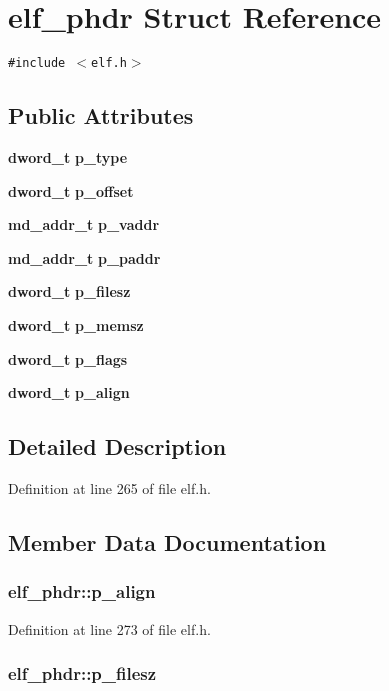 \section{elf\_\-phdr Struct Reference}
\label{structelf__phdr}
{\tt \#include $<$elf.h$>$}

\subsection*{Public Attributes}
\begin{CompactItemize}
\item 
{\bf dword\_\-t} {\bf p\_\-type}
\item 
{\bf dword\_\-t} {\bf p\_\-offset}
\item 
{\bf md\_\-addr\_\-t} {\bf p\_\-vaddr}
\item 
{\bf md\_\-addr\_\-t} {\bf p\_\-paddr}
\item 
{\bf dword\_\-t} {\bf p\_\-filesz}
\item 
{\bf dword\_\-t} {\bf p\_\-memsz}
\item 
{\bf dword\_\-t} {\bf p\_\-flags}
\item 
{\bf dword\_\-t} {\bf p\_\-align}
\end{CompactItemize}


\subsection{Detailed Description}


Definition at line 265 of file elf.h.

\subsection{Member Data Documentation}
\subsubsection[{p\_\-align}]{ {\bf elf\_\-phdr::p\_\-align}}\label{structelf__phdr_36ff4bd58a37eb99f9692df23a08529c}




Definition at line 273 of file elf.h.
\subsubsection[{p\_\-filesz}]{ {\bf elf\_\-phdr::p\_\-filesz}}\label{structelf__phdr_8419bdb2e0741794689437fa37f8c658}




